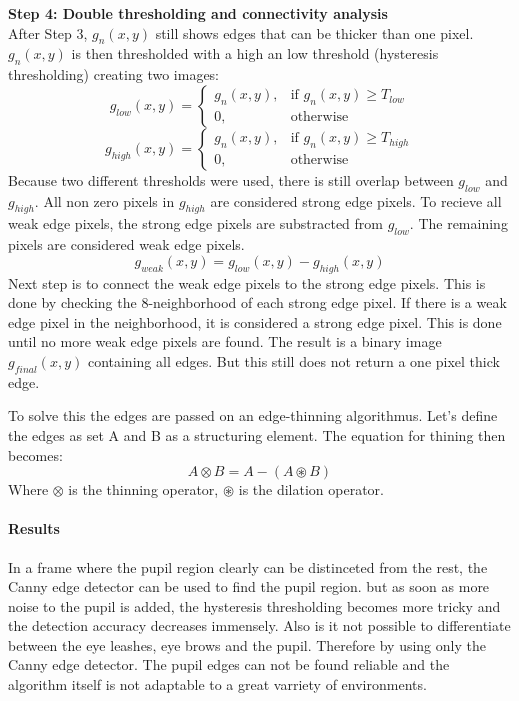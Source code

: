   

\textbf{Step 4: Double thresholding and connectivity analysis} \\
After Step 3, $g_n(x,y)$ still shows edges that can be thicker than one pixel. $g_n(x,y)$ is then thresholded with a high an low threshold (hysteresis thresholding) creating two images: 
\begin{equation}
    g_{low}(x,y) = \begin{cases}
    g_n(x,y), & \text{if } g_n(x,y) \geq T_{low} \\
    0, &\text{otherwise}
\end{cases}
\end{equation}
\begin{equation}
    g_{high}(x,y) = \begin{cases}
    g_n(x,y), & \text{if } g_n(x,y) \geq T_{high} \\
    0, &\text{otherwise}
\end{cases}
\end{equation}
Because two different thresholds were used, there is still overlap between $g_{low}$ and $g_{high}$. All non zero pixels in $g_{high}$ are considered strong edge pixels. To recieve all weak edge pixels, the strong edge pixels are substracted from $g_{low}$. The remaining pixels are considered weak edge pixels.
\begin{equation}
    g_{weak}(x,y) = g_{low}(x,y) - g_{high}(x,y)
\end{equation}
Next step is to connect the weak edge pixels to the strong edge pixels. This is done by checking the 8-neighborhood of each strong edge pixel. If there is a weak edge pixel in the neighborhood, it is considered a strong edge pixel. This is done until no more weak edge pixels are found. The result is a binary image $g_{final}(x,y)$ containing all edges. But this still does not return a one pixel thick edge. 

To solve this the edges are passed on an edge-thinning algorithmus. Let's define the edges as set A and B as a structuring element. 
The equation for thining then becomes: 
\begin{equation}
    A \otimes   B = A - (A \circledast B)
\end{equation}
Where $\otimes$ is the thinning operator, $\circledast$ is the dilation operator.

\paragraph{Results}
In a frame where the pupil region clearly can be distinceted from the rest, the Canny edge detector can be used to find the pupil region. but as soon as more noise to the pupil is added, the hysteresis thresholding becomes more tricky and the detection accuracy decreases immensely. Also is it not possible to differentiate between the eye leashes, eye brows and the pupil. Therefore by using only the Canny edge detector. The pupil edges can not be found reliable and the algorithm itself is not adaptable to a great varriety of environments. 


